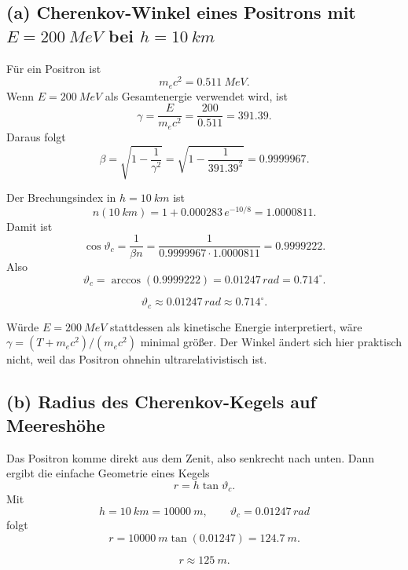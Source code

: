 \documentclass[11pt,a4paper]{scrartcl}
\theoremstyle{definition}
\theoremstyle{plain}
\theoremstyle{remark}
\begin{document}
\subsection*{(a) Cherenkov-Winkel eines Positrons mit $E=\SI{200}{MeV}$ bei $h=\SI{10}{km}$}

\begin{calculationbox}
F\"ur ein Positron ist
\[
    m_ec^2=\SI{0.511}{MeV}.
\]
Wenn $E=\SI{200}{MeV}$ als Gesamtenergie verwendet wird, ist
\[
    \gamma=\frac{E}{m_ec^2}=\frac{200}{0.511}=391.39.
\]
Daraus folgt
\[
    \beta=\sqrt{1-\frac{1}{\gamma^2}}
    =\sqrt{1-\frac{1}{391.39^2}}
    =0.9999967.
\]
\end{calculationbox}

\begin{calculationbox}
Der Brechungsindex in $h=\SI{10}{km}$ ist
\[
    n(\SI{10}{km})=1+0.000283\,e^{-10/8}=1.0000811.
\]
Damit ist
\[
    \cos\vartheta_c=\frac{1}{\beta n}
    =\frac{1}{0.9999967\cdot 1.0000811}
    =0.9999222.
\]
Also
\[
    \vartheta_c=\arccos(0.9999222)
    =0.01247\,\si{rad}
    =0.714^\circ.
\]
\end{calculationbox}

\begin{answerbox}
\[
    \boxed{\vartheta_c\approx 0.01247\,\si{rad}\approx 0.714^\circ}.
\]
\end{answerbox}

\begin{notebox}
W\"urde $E=\SI{200}{MeV}$ stattdessen als kinetische Energie interpretiert, w\"are $\gamma=(T+m_ec^2)/(m_ec^2)$ minimal gr\"o\ss{}er. Der Winkel \"andert sich hier praktisch nicht, weil das Positron ohnehin ultrarelativistisch ist.
\end{notebox}

\subsection*{(b) Radius des Cherenkov-Kegels auf Meeresh\"ohe}

\begin{calculationbox}
Das Positron komme direkt aus dem Zenit, also senkrecht nach unten. Dann ergibt die einfache Geometrie eines Kegels
\[
    r=h\tan\vartheta_c.
\]
Mit
\[
    h=\SI{10}{km}=\SI{10000}{m},
    \qquad
    \vartheta_c=0.01247\,\si{rad}
\]
folgt
\[
    r=\SI{10000}{m}\tan(0.01247)=\SI{124.7}{m}.
\]
\end{calculationbox}

\begin{answerbox}
\[
    \boxed{r\approx \SI{125}{m}}.
\]
\end{answerbox}
\end{document}
